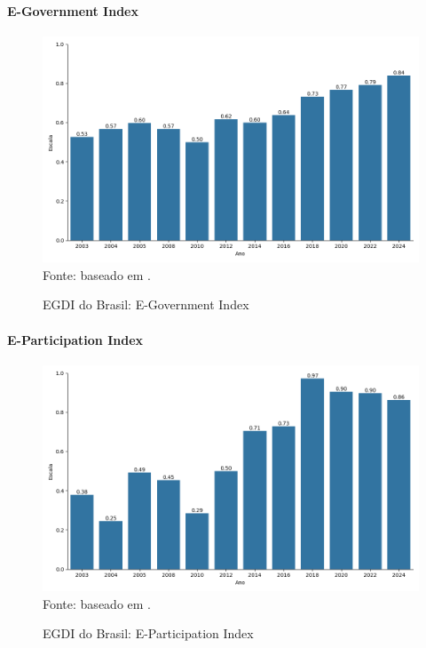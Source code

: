 \paragraph{E-Government Index}

\begin{figure}[H]
	\centering
	\caption{EGDI do Brasil: E-Government Index}
	\includegraphics[width=1\linewidth]{figuras/egdi/egdi_brasil_egov.png}
	\label{fig:egdi_brasil_egov}
	\footnotesize{Fonte: baseado em \cite{ONU_edgi_mapa}.}
\end{figure}

\paragraph{E-Participation Index}

\begin{figure}[H]
	\centering
	\caption{EGDI do Brasil: E-Participation Index}
	\includegraphics[width=1\linewidth]{figuras/egdi/egdi_brasil_epart.png}
	\label{fig:egdi_brasil_epart}
	\footnotesize{Fonte: baseado em \cite{ONU_edgi_mapa}.}
\end{figure}

